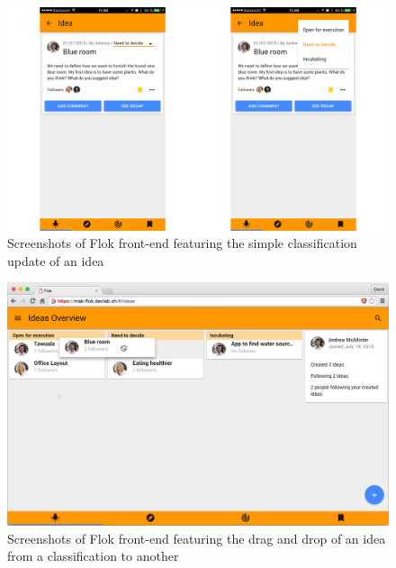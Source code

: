 \documentclass[a4paper,12pt, oneside]{article}
\begin{document}
\begin{figure}[!htb]
\centering
\includegraphics[width=\textwidth]{images/classificationSelect.png}
\caption{Screenshots of Flok front-end featuring the simple classification update of an idea}
\label{fig.classificationSelect}
\end{figure}

\begin{figure}[!htb]
\centering
\includegraphics[width=\textwidth]{images/classificationDragAndDrop.png}
\caption{Screenshots of Flok front-end featuring the drag and drop of an idea from a classification to another}
\label{fig.classificationDragAndDrop}
\end{figure}

\FloatBarrier
\end{document}
